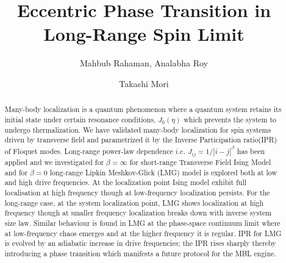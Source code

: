 \documentclass[%
 reprint,
 amsmath,amssymb,
 aps,
]{revtex4-2}
\begin{document}

\title{Eccentric Phase Transition in Long-Range Spin Limit}%

\author{Mahbub Rahaman, Analabha Roy}
\author{Takashi Mori}%


\begin{abstract}
Many-body localization is a  quantum phenomenon where a quantum system retains its initial state under certain resonance conditions, $J_0(\eta)$ which prevents the system to undergo thermalization. We have validated many-body localization for spin systems driven by transverse field and parametrized it by the Inverse Participation ratio(IPR) of Floquet modes. Long-range power-law dependence $i.e.$ $J_{ij} = 1/|i-j|^{\beta}$ has been applied and we investigated for $\beta = \infty$ for short-range Transverse Field Ising Model and for  $\beta = 0$  long-range Lipkin Meshkov-Glick (LMG) model is explored both at low and high drive frequencies. At the localization point Ising model exhibit full localisation at  high frequency though at low-frequency localization persists. For the long-range case, at the system localization point, LMG shows localization at high frequency though at smaller frequency localization breaks down with inverse system size law. Similar behaviour is found in LMG at the phase-space continuum limit where at low-frequency chaos emerges and at the higher frequency it is regular. IPR for LMG is evolved by an adiabatic increase in drive frequencies; the IPR rises sharply  thereby introducing a phase transition which manifests a future protocol for the MBL engine.
 
\end{abstract}
\end{document}
